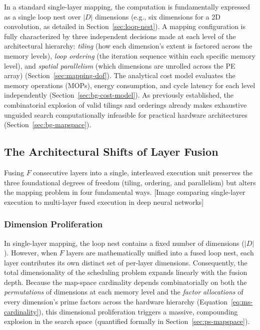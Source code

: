 In a standard single-layer mapping, the computation is fundamentally expressed as a single loop nest over $|D|$ dimensions (e.g., six dimensions for a 2D convolution, as detailed in Section~\ref{sec:loop-nest}). A mapping configuration is fully characterized by three independent decisions made at each level of the architectural hierarchy: \emph{tiling} (how each dimension's extent is factored across the memory levels), \emph{loop ordering} (the iteration sequence within each specific memory level), and \emph{spatial parallelism} (which dimensions are unrolled across the PE array) (Section~\ref{sec:mapping-dof}). 
The analytical cost model evaluates the memory operations (MOPs), energy consumption, and cycle latency for each level independently (Section~\ref{sec:bg-cost-model}). As previously established, the combinatorial explosion of valid tilings and orderings already makes exhaustive unguided search computationally infeasible for practical hardware architectures (Section~\ref{sec:bg-mapspace}).

\subsection{The Architectural Shifts of Layer Fusion}
\label{sec:fds-what-changes}

Fusing $F$ consecutive layers into a single, interleaved execution unit preserves the three foundational degrees of freedom (tiling, ordering, and parallelism) but alters the mapping problem in four fundamental ways. [Image comparing single-layer execution to multi-layer fused execution in deep neural networks]

\subsubsection{Dimension Proliferation}
\label{sec:fds-dim-proliferation}

In single-layer mapping, the loop nest contains a fixed number of dimensions ($|D|$). However, when $F$ layers are mathematically unified into a fused loop nest, each layer contributes its own distinct set of per-layer dimensions. Consequently, the total dimensionality of the scheduling problem expands linearly with the fusion depth. Because the map-space cardinality depends combinatorially on both the \emph{permutations} of dimensions at each memory level and the \emph{factor allocations} of every dimension's prime factors across the hardware hierarchy (Equation~\ref{eq:ms-cardinality}), this dimensional proliferation triggers a massive, compounding explosion in the search space (quantified formally in Section~\ref{sec:ps-mapspace}).


